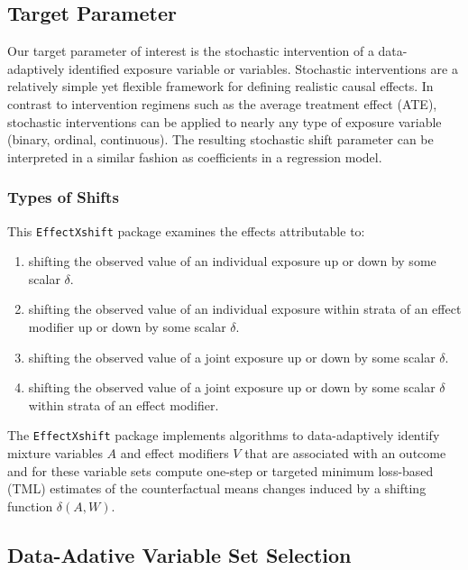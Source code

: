 \documentclass[
]{article}
\providecommand{\tightlist}{%
  \setlength{\itemsep}{0pt}\setlength{\parskip}{0pt}}
\begin{document}
\hypertarget{target-parameter}{%
\subsection{Target Parameter}\label{target-parameter}}

Our target parameter of interest is the stochastic intervention of a
data-adaptively identified exposure variable or variables. Stochastic
interventions are a relatively simple yet flexible framework for
defining realistic causal effects. In contrast to intervention regimens
such as the average treatment effect (ATE), stochastic interventions can
be applied to nearly any type of exposure variable (binary, ordinal,
continuous). The resulting stochastic shift parameter can be interpreted
in a similar fashion as coefficients in a regression model.

\hypertarget{types-of-shifts}{%
\subsubsection{Types of Shifts}\label{types-of-shifts}}

This \texttt{EffectXshift} package examines the effects attributable to:

\begin{enumerate}
\def\labelenumi{\arabic{enumi}.}
\tightlist
\item
  shifting the observed value of an individual exposure up or down by
  some scalar \(\delta\).
\item
  shifting the observed value of an individual exposure within strata of
  an effect modifier up or down by some scalar \(\delta\).
\item
  shifting the observed value of a joint exposure up or down by some
  scalar \(\delta\).
\item
  shifting the observed value of a joint exposure up or down by some
  scalar \(\delta\) within strata of an effect modifier.
\end{enumerate}

The \texttt{EffectXshift} package implements algorithms to data-adaptively
identify mixture variables \(A\) and effect modifiers \(V\) that are
associated with an outcome and for these variable sets compute one-step
or targeted minimum loss-based (TML) estimates of the counterfactual
means changes induced by a shifting function \(\delta(A,W)\).

\hypertarget{data-adative-variable-set-selection}{%
\subsection{Data-Adative Variable Set
Selection}\label{data-adative-variable-set-selection}}
\end{document}
